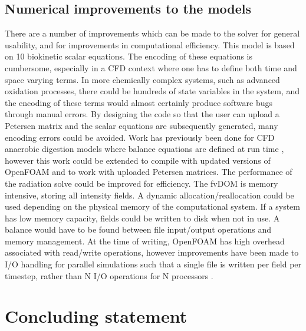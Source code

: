 \subsection{Numerical improvements to the models}
There are a number of improvements which can be made to the solver for general usability, and for improvements in computational efficiency. This model is based on 10 biokinetic scalar equations. The encoding of these equations is cumbersome, especially in a CFD context where one has to define both time and space varying terms. In more chemically complex systems, such as advanced oxidation processes, there could be hundreds of state variables in the system, and the encoding of these terms would almost certainly produce software bugs through manual errors. By designing the code so that the user can upload a Petersen matrix and the scalar equations are subsequently generated, many encoding errors could be avoided. Work has previously been done for CFD anaerobic digestion models where balance equations are defined at run time \cite{gaden2013}, however this work could be extended to compile with updated versions of OpenFOAM and to work with uploaded Petersen matrices.
\skippingparagraph
The performance of the radiation solve could be improved for efficiency. The fvDOM is memory intensive, storing all intensity fields. A dynamic allocation/reallocation could be used depending on the physical memory of the computational system. If a system has low memory capacity, fields could be written to disk when not in use. A balance would have to be found between file input/output operations and memory management. At the time of writing, OpenFOAM has high overhead associated with read/write operations, however improvements have been made to I/O handling for parallel simulations such that a single file is written per field per timestep, rather than N I/O operations for N processors \cite{theopenfoamfoundation2017}. 


\section{Concluding statement}
